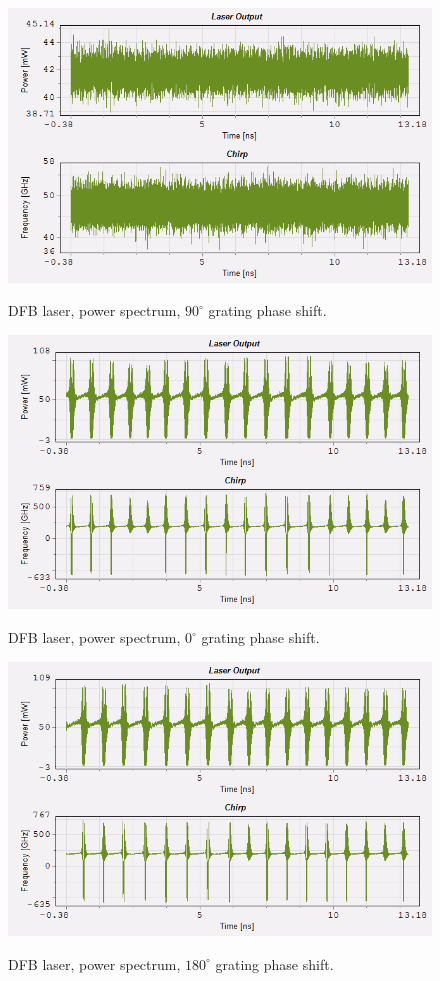 \documentclass[a4paper,10pt]{report}
\begin{document}
\begin{figure}[!ht]
  \centering
  \includegraphics[width=12cm]{6_4.png}\\
  \caption{DFB laser, power spectrum, $90^\circ$ grating phase shift.}
  \label{6_4}
\end{figure}

\begin{figure}[!ht]
  \centering
  \includegraphics[width=12cm]{6_5.png}\\
  \caption{DFB laser, power spectrum, $0^\circ$ grating phase shift.}
  \label{6_5}
\end{figure}

\begin{figure}[!ht]
  \centering
  \includegraphics[width=12cm]{6_6.png}\\
  \caption{DFB laser, power spectrum, $180^\circ$ grating phase shift.}
  \label{6_6}
\end{figure}
\end{document}
